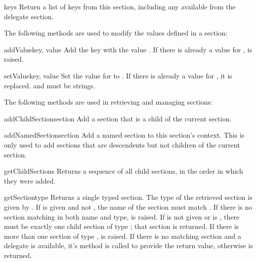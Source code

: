 \documentclass{howto}
\begin{document}
\begin{methoddesc}[Configuration]{keys}{}
  Return a list of keys from this section, including any available
  from the delegate section.
\end{methoddesc}


The following methods are used to modify the values defined in a
section:

\begin{methoddesc}[Configuration]{addValue}{key, value}
  Add the key  with the value .  If there is
  already a value for ,  is
  raised.
\end{methoddesc}

\begin{methoddesc}[Configuration]{setValue}{key, value}
  Set the value for  to .  If there is already a
  value for , it is replaced.   and  must
  be strings.
\end{methoddesc}


The following methods are used in retrieving and managing sections:

\begin{methoddesc}[Configuration]{addChildSection}{section}
  Add a section that is a child of the current section.
\end{methoddesc}

\begin{methoddesc}[Configuration]{addNamedSection}{section}
  Add a named section to this section's context.  This is only used to
  add sections that are descendents but not children of the current
  section.
\end{methoddesc}

\begin{methoddesc}[Configuration]{getChildSections}{}
  Returns a sequence of all child sections, in the order in which they
  were added.
\end{methoddesc}

\begin{methoddesc}[Configuration]{getSection}{type}
  Returns a single typed section.  The type of the retrieved section
  is given by .  If  is given and not ,
  the name of the section must match .  If there is no
  section matching in both name and type,  is
  raised.  If  is not given or is , there must be
  exactly one child section of type ; that section is
  returned.  If there is more than one section of type ,
   is raised.  If
  there is no matching section and a delegate is available, it's
   method is called to provide the return value,
  otherwise  is returned.
\end{methoddesc}
\end{document}
